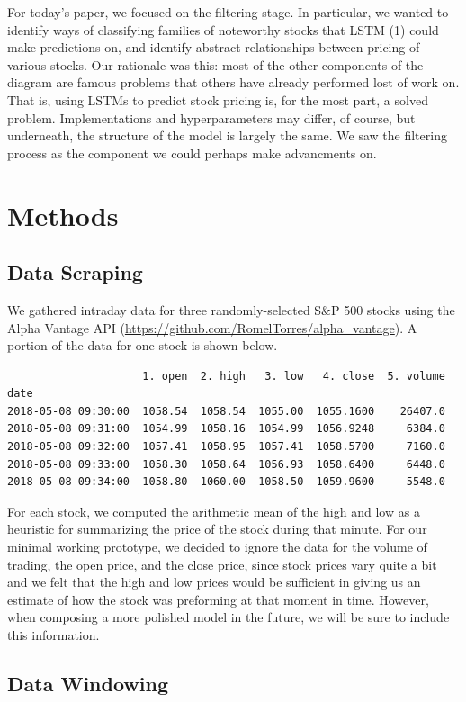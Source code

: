 \documentclass[final]{article}
\begin{document}
For today's paper, we focused on the filtering stage. In particular,
we wanted to identify ways of classifying families of noteworthy
stocks that LSTM (1) could make predictions on, and identify abstract
relationships between pricing of various stocks. Our rationale was
this: most of the other components of the diagram are famous problems
that others have already performed lost of work on. That is, using
LSTMs to predict stock pricing is, for the most part, a solved
problem. Implementations and hyperparameters may differ, of course,
but underneath, the structure of the model is largely the same. We saw
the filtering process as the component we could perhaps make
advancments on.

\section{Methods}

\subsection{Data Scraping}

We gathered intraday data for three randomly-selected S\&P 500 stocks
using the Alpha Vantage API
(\url{https://github.com/RomelTorres/alpha_vantage}). A portion of the
data for one stock is shown below.

\begin{verbatim}
                     1. open  2. high   3. low   4. close  5. volume
date
2018-05-08 09:30:00  1058.54  1058.54  1055.00  1055.1600    26407.0
2018-05-08 09:31:00  1054.99  1058.16  1054.99  1056.9248     6384.0
2018-05-08 09:32:00  1057.41  1058.95  1057.41  1058.5700     7160.0
2018-05-08 09:33:00  1058.30  1058.64  1056.93  1058.6400     6448.0
2018-05-08 09:34:00  1058.80  1060.00  1058.50  1059.9600     5548.0
\end{verbatim}

For each stock, we computed the arithmetic mean of the high and low as
a heuristic for summarizing the price of the stock during that minute.
For our minimal working prototype, we decided to ignore the data for
the volume of trading, the open price, and the close price, since
stock prices vary quite a bit and we felt that the high and low prices
would be sufficient in giving us an estimate of how the stock was
preforming at that moment in time. However, when composing a more
polished model in the future, we will be sure to include this
information.

\subsection{Data Windowing}
\end{document}
